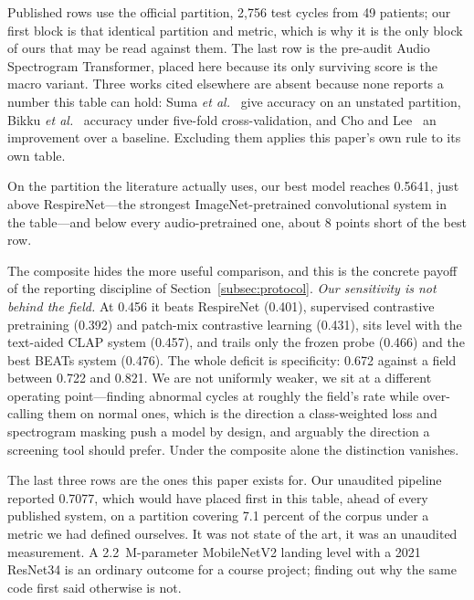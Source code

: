 \documentclass[journal,onecolumn]{IEEEtran}
\begin{document}
\begin{table}[!t]
\vspace{2pt}
\footnotesize Published rows use the official partition, 2,756 test cycles from 49 patients; our
first block is that identical partition and metric, which is why it is the only block of ours
that may be read against them. The last row is the pre-audit Audio Spectrogram Transformer,
placed here because its only surviving score is the macro variant. Three works cited elsewhere
are absent because none reports a number this table can hold: Suma
\emph{et al.}~\cite{suma2025mtl} give accuracy on an unstated partition, Bikku
\emph{et al.}~\cite{scirep2025cnnrnn} accuracy under five-fold cross-validation, and Cho and
Lee~\cite{cho2025openset} an improvement over a baseline. Excluding them applies this paper's
own rule to its own table.
\end{table}

On the partition the literature actually uses, our best model reaches 0.5641, just above
RespireNet---the strongest ImageNet-pretrained convolutional system in the table---and below
every audio-pretrained one, about 8 points short of the best row.

The composite hides the more useful comparison, and this is the concrete payoff of the
reporting discipline of Section~\ref{subsec:protocol}. \emph{Our sensitivity is not behind the
field.} At 0.456 it beats RespireNet (0.401), supervised contrastive pretraining (0.392) and
patch-mix contrastive learning (0.431), sits level with the text-aided CLAP system (0.457), and
trails only the frozen probe (0.466) and the best BEATs system (0.476). The whole deficit is
specificity: 0.672 against a field between 0.722 and 0.821. We are not uniformly weaker, we sit
at a different operating point---finding abnormal cycles at roughly the field's rate while
over-calling them on normal ones, which is the direction a class-weighted loss and spectrogram
masking push a model by design, and arguably the direction a screening tool should prefer.
Under the composite alone the distinction vanishes.

The last three rows are the ones this paper exists for. Our unaudited pipeline reported 0.7077,
which would have placed first in this table, ahead of every published system, on a partition
covering 7.1 percent of the corpus under a metric we had defined ourselves. It was not state of
the art, it was an unaudited measurement. A 2.2~M-parameter MobileNetV2 landing level with a
2021 ResNet34 is an ordinary outcome for a course project; finding out why the same code first
said otherwise is not.
\end{document}
